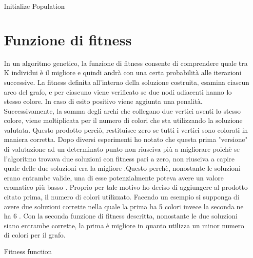 \documentclass{article}
\begin{document}
\begin{enumerate}
\begin{algorithm}
\caption{Initialize Population}\label{alg:cap}
\begin{algorithmic} 
\State {}
        \endfor

\endwhile
\end{algorithmic}
\end{algorithm}

\section{Funzione di fitness}
In un algoritmo genetico, la funzione di fitness consente di comprendere quale tra K individui è il migliore e quindi andrà con una certa probabilità alle iterazioni successive. La fitness definita all'interno della soluzione costruita, esamina ciascun arco del grafo, e per ciascuno viene verificato se due nodi adiacenti hanno lo stesso colore. In caso di esito positivo viene aggiunta una penalità. Successivamente, la somma degli archi che collegano due vertici aventi lo stesso colore, viene moltiplicata per il numero di colori che sta utilizzando la soluzione valutata. Questo prodotto perciò, restituisce zero se tutti i vertici sono colorati in maniera corretta. Dopo diversi esperimenti ho notato che questa prima "versione" di valutazione ad un determinato punto non riusciva più a migliorare poichè se l'algoritmo trovava due soluzioni con fitness pari a zero, non riusciva a capire quale delle due soluzioni era la migliore .Questo perchè, nonostante le soluzioni erano entrambe valide, una di esse potenzialmente poteva avere un valore cromatico più basso . Proprio per tale motivo ho deciso di aggiungere al prodotto citato prima, il numero di colori utilizzato. Facendo un esempio si supponga di avere due soluzioni corrette nella quale  la prima ha 5 colori invece la seconda ne ha 6 . Con la seconda funzione di fitness descritta, nonostante le due soluzioni siano entrambe corrette, la prima è migliore in quanto utilizza un minor numero di colori per il grafo.

\begin{algorithm}
\caption{Fitness function}\label{alg:cap}
\begin{algorithmic} 
            \State $count \gets count+1$
            \EndIf
        \EndFor
    \State \textbf{return} $(colors * count) + colors$}
\end{algorithmic}
\end{algorithm}


\end{enumerate}
\end{document}
